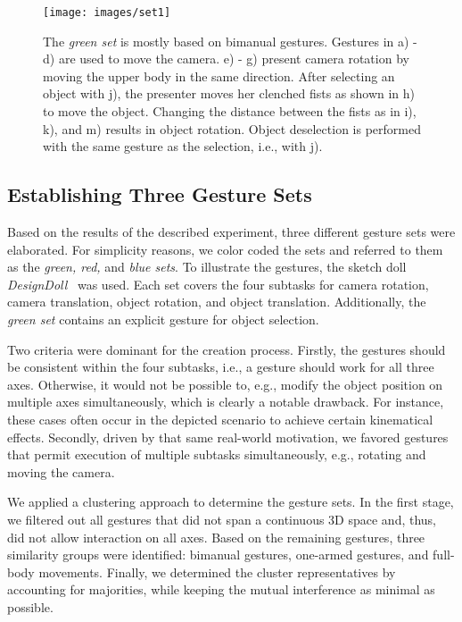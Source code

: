 \documentclass{sigchi}
\begin{document}
\begin{figure}[t]
\centering
\texttt{[image: images/set1]}
\vskip-1mm
\caption{The \textit{green set} is mostly based on bimanual gestures. Gestures in a) - d) are used to move the camera. e) - g) present camera rotation by moving the upper body in the same direction. After selecting an object with j), the presenter moves her clenched fists as shown in h) to move the object. Changing the distance between the fists as in i), k), and m) results in object rotation. Object deselection is performed with the same gesture as the selection, i.e., with j).}
\label{fig:set1}
\end{figure}







\subsection{Establishing Three Gesture Sets}
\label{sets}
Based on the results of the described experiment, three different gesture sets were elaborated. For simplicity reasons, we color coded the sets and referred to them as the \textit{green, red,} and \textit{blue sets}. To illustrate the gestures, the sketch doll \textit{DesignDoll}~\cite{DesignDoll} was used. Each set covers the four subtasks for camera rotation, camera translation, object rotation, and object translation. Additionally, the \textit{green set} contains an explicit gesture for object selection. 

Two criteria were dominant for the creation process. Firstly, the gestures should be consistent within the four subtasks, i.e., a gesture should work for all three axes. Otherwise, it would not be possible to, e.g., modify the object position on multiple axes simultaneously, which is clearly a notable drawback. For instance, these cases often occur in the depicted scenario to achieve certain kinematical effects. Secondly, driven by that same real-world motivation, we favored gestures that permit execution of multiple subtasks simultaneously, e.g., rotating and moving the camera.

We applied a clustering approach to determine the gesture sets. In the first stage, we filtered out all gestures that did not span a continuous 3D space and, thus, did not allow interaction on all axes. Based on the remaining gestures, three similarity groups were identified:  bimanual gestures, one-armed gestures, and full-body movements. Finally, we determined the cluster representatives by accounting for majorities, while keeping the mutual interference as minimal as possible.
\end{document}
